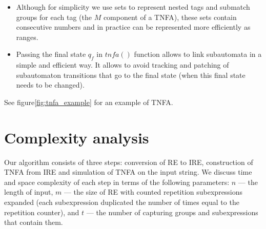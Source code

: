 \documentclass[AMA,STIX1COL]{WileyNJD-v2}
\begin{document}
\begin{itemize}[itemsep=0.2em, topsep=0.5em]
    \item Although for simplicity we use sets to represent nested tags and submatch groups for each tag (the $M$ component of a TNFA),
        these sets contain consecutive numbers and in practice can be represented more efficiently as ranges.

    \item Passing the final state $q_f$ in $tn\!f\!a()$ function allows to link subautomata in a simple and efficient way.
        It allows to avoid tracking and patching of subautomaton transitions that go to the final state
        (when this final state needs to be changed).
    \\[-0.5em]
\end{itemize}

See figure\ref{fig:tnfa_example} for an example of TNFA.


\section{Complexity analysis}\label{section_complexity}

Our algorithm consists of three steps: conversion of RE to IRE,
construction of TNFA from IRE
and simulation of TNFA on the input string.
We discuss time and space complexity of each step
in terms of the following parameters:
$n$ --- the length of input,
$m$ --- the size of RE with counted repetition subexpressions expanded
(each subexpression duplicated the number of times equal to the repetition counter),
and $t$ --- the number of capturing groups and subexpressions that contain them.
\\
\end{document}
